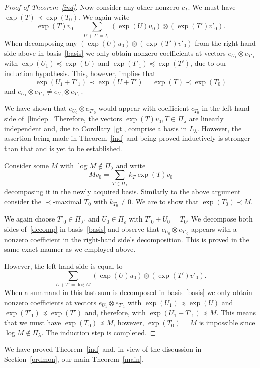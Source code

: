 \documentclass[ALCO,ThmDefs,Unicode]{cedram}
\newcommand{\la}{\lambda}
\begin{document}
\begin{proof}[Proof of Theorem~\ref{ind}]
Now consider any other nonzero $c_T$. We must have $\exp(T)\prec\exp(T_0)$. We again write
\[
\exp(T)v_0=\sum_{U+T'=T_0}(\exp(U)u_0)\otimes(\exp(T')v'_0).
\]
When decomposing any $(\exp(U)u_0)\otimes(\exp(T')v'_0)$ from the right-hand side above in basis~\eqref{basis} we only obtain nonzero coefficients at vectors $e_{U_1}\otimes e_{T'_1}$ with $\exp(U_1)\preceq\exp(U)$ and $\exp(T'_1)\preceq\exp(T')$, due to our induction hypothesis. This, however, implies that
\[
\exp(U_1+T'_1)\prec\exp(U+T')=\exp(T)\prec\exp(T_0)
\]
and $e_{U_1}\otimes e_{T'_1}\neq e_{U_0}\otimes e_{T'_0}$.

We have shown that $e_{U_0}\otimes e_{T'_0}$ would appear with coefficient $c_{T_0}$ in the left-hand side of~\eqref{lindep}. Therefore, the vectors $\exp(T)v_0,T\in\Pi_\la$ are linearly independent and, due to Corollary~\ref{gt}, comprise a basis in $L_\la$. However, the assertion being made in Theorem~\ref{ind} and being proved inductively is stronger than that and is yet to be established.

Consider some $M$ with $\log M\notin\Pi_\la$ and write
\begin{equation}\label{decomp}
Mv_0=\sum_{T\in\Pi_\la}k_T\exp(T)v_0
\end{equation}
decomposing it in the newly acquired basis. Similarly to the above argument consider the $\prec$-maximal $T_0$ with $k_{T_0}\neq 0$. We are to show that $\exp(T_0)\prec M$.

We again choose $T'_0\in\Pi_{\la'}$ and $U_0\in\Pi_\varepsilon$ with $T'_0+U_0=T_0$. We decompose both sides of~\eqref{decomp} in basis~\eqref{basis} and observe that $e_{U_0}\otimes e_{T'_0}$ appears with a nonzero coefficient in the right-hand side's decomposition. This is proved in the same exact manner as we employed above.

However, the left-hand side is equal to
\[
\sum_{U+T'=\log M}(\exp(U)u_0)\otimes(\exp(T')v'_0).
\]
When a summand in this last sum is decomposed in basis~\eqref{basis} we only obtain nonzero coefficients at vectors $e_{U_1}\otimes e_{T'_1}$ with $\exp(U_1)\preceq\exp(U)$ and $\exp(T'_1)\preceq\exp(T')$ and, therefore, with $\exp(U_1+T'_1)\preceq M$. This means that we must have $\exp(T_0)\preceq M$, however, $\exp(T_0)=M$ is impossible since $\log M\notin\Pi_\la$. The induction step is completed.
\end{proof}

We have proved Theorem~\ref{ind} and, in view of the discussion in Section~\ref{ordmon}, our main Theorem~\ref{main}.
\end{document}
